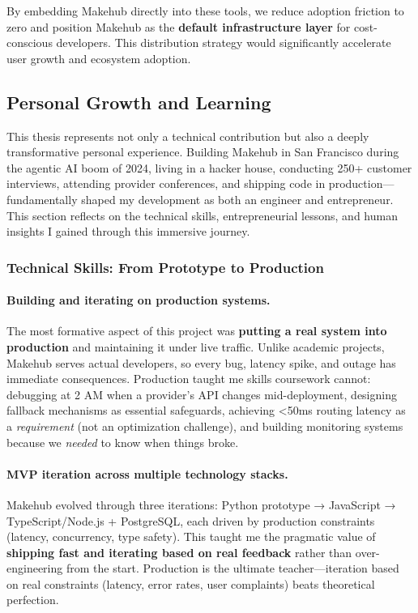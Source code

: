 \documentclass[english]{article}
\begin{document}
By embedding Makehub directly into these tools, we reduce adoption friction to zero and position Makehub as the \textbf{default infrastructure layer} for cost-conscious developers. This distribution strategy would significantly accelerate user growth and ecosystem adoption.

\subsection{Personal Growth and Learning}

This thesis represents not only a technical contribution but also a deeply transformative personal experience. Building Makehub in San Francisco during the agentic AI boom of 2024, living in a hacker house, conducting 250+ customer interviews, attending provider conferences, and shipping code in production—fundamentally shaped my development as both an engineer and entrepreneur. This section reflects on the technical skills, entrepreneurial lessons, and human insights I gained through this immersive journey.

\subsubsection{Technical Skills: From Prototype to Production}

\paragraph{Building and iterating on production systems.}

The most formative aspect of this project was \textbf{putting a real system into production} and maintaining it under live traffic. Unlike academic projects, Makehub serves actual developers, so every bug, latency spike, and outage has immediate consequences. Production taught me skills coursework cannot: debugging at 2 AM when a provider's API changes mid-deployment, designing fallback mechanisms as essential safeguards, achieving <50ms routing latency as a \emph{requirement} (not an optimization challenge), and building monitoring systems because we \emph{needed} to know when things broke.

\paragraph{MVP iteration across multiple technology stacks.}

Makehub evolved through three iterations: Python prototype → JavaScript → TypeScript/Node.js + PostgreSQL, each driven by production constraints (latency, concurrency, type safety). This taught me the pragmatic value of \textbf{shipping fast and iterating based on real feedback} rather than over-engineering from the start. Production is the ultimate teacher—iteration based on real constraints (latency, error rates, user complaints) beats theoretical perfection.
\end{document}
